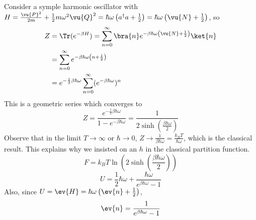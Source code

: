 \documentclass[a4paper,twoside,master.tex]{subfiles}
\begin{document}
\begin{ex}
    Consider a symple harmonic oscillator with $ H = \frac{\vu{P}^2}{2m} + \frac{1}{2} m \omega^2 \vu{Q}^2 = \hbar \omega \left( a^\dagger a + \frac{1}{2} \right) = \hbar \omega \left( \vu{N} + \frac{1}{2} \right) $, so
    \begin{align}
        Z &= \Tr(e^{- \beta H}) = \sum_{n=0}^{\infty}\bra{n} e^{- \beta \hbar \omega \left( \vu{N} + \frac{1}{2} \right)}\ket{n} \\
        &= \sum_{n=0}^{\infty} e^{- \beta \hbar \omega \left( n + \frac{1}{2} \right)} \\
        &= e^{- \frac{1}{2} \beta \hbar \omega} \sum_{n=0}^{\infty} (e^{- \beta \hbar \omega})^n
    \end{align}
    This is a geometric series which converges to
    \begin{equation}
        Z = \frac{e^{- \frac{1}{2} \beta \hbar \omega}}{1 - e^{- \beta \hbar \omega}} = \frac{1}{2 \sinh(\frac{\beta \hbar \omega}{2})}
    \end{equation}
    Observe that in the limit $ T \to \infty $ or $ \hbar \to 0 $, $ Z \to \frac{1}{\beta \hbar \omega} = \frac{k_B T}{\hbar \omega} $, which is the classical result. This explains why we insisted on an $ h $ in the classical partition function.
    \begin{equation}
        F = k_B T \ln\left( 2 \sinh(\frac{\beta \hbar \omega}{2}) \right)
    \end{equation}
    \begin{equation}
        U = \frac{1}{2} \hbar \omega + \frac{\hbar \omega}{e^{\beta \hbar \omega} - 1}
    \end{equation}
    Also, since $ U = \ev{H} = \hbar \omega \left( \ev{n} + \frac{1}{2} \right) $,
    \begin{equation}
        \ev{n} = \frac{1}{e^{\beta \hbar \omega} - 1}
    \end{equation}
\end{ex}
\end{document}
